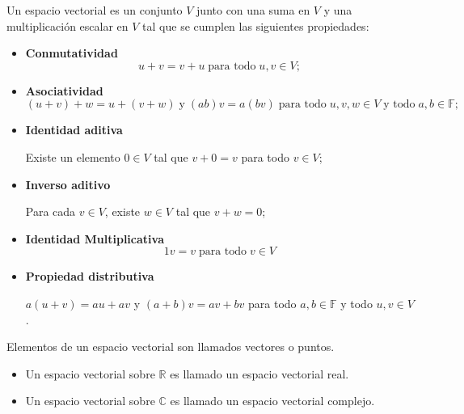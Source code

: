 \begin{tcolorbox}[colback=white]
    \begin{def.} Un espacio vectorial es un conjunto $V$ junto con una suma en $V$ y una multiplicación escalar en $V$ tal que se cumplen las siguientes propiedades: 
	\begin{itemize}
	    \item \textbf{Conmutatividad}
		$$u+v=v+u\; \mbox{para todo}\; u,v\in V;$$
	    \item \textbf{Asociatividad}
		$$(u+v)+w=u+(v+w)\; \mbox{y}\; (ab)v=a(bv)\; \mbox{para todo}\; u,v,w \in V\; \mbox{y todo}\; a,b\in \mathbb{F};$$
	    \item \textbf{Identidad aditiva}
		\begin{center}
		    Existe un elemento $0\in V$ tal que $v+0=v$ para todo $v\in V$;
		\end{center}

	    \item \textbf{Inverso aditivo}
		\begin{center}
		    Para cada $v\in V$, existe $w \in V$ tal que $v+w=0$;
		\end{center}

	    \item \textbf{Identidad Multiplicativa}
		$$1v=v\; \mbox{para todo}\; v\in V$$

	    \item \textbf{Propiedad distributiva}
		\begin{center}
		    $a(u+v)=au+av$ y $(a+b)v=av+bv$ para todo $a,b\in \mathbb{F}$ y todo $u,v \in V$.
		\end{center}
	\end{itemize}
    \end{def.}
\end{tcolorbox}

\begin{tcolorbox}[colback=white]
    \begin{def.}
	Elementos de un espacio vectorial son llamados vectores o puntos.
    \end{def.}
\end{tcolorbox}

\begin{tcolorbox}[colback=white]
    \begin{def.}\hfill
	\begin{itemize}
	    \item Un espacio vectorial sobre $\mathbb{R}$ es llamado un espacio vectorial real.
	    \item Un espacio vectorial sobre $\mathbb{C}$ es llamado un espacio vectorial complejo.
	\end{itemize}
    \end{def.}
\end{tcolorbox}

